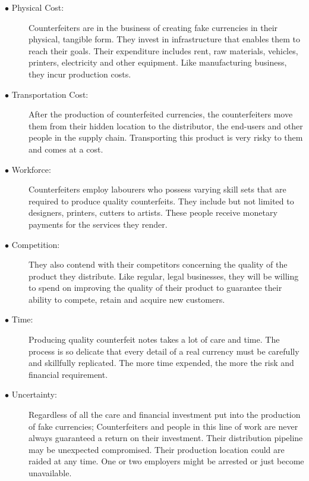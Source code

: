 \vspace{1mm}
\begin{description}
  \item[$\bullet$ Physical Cost:] Counterfeiters are in the business of creating fake currencies in their physical, tangible form. They invest in infrastructure that enables them to reach their goals. Their expenditure includes rent, raw materials, vehicles, printers, electricity and other equipment. Like manufacturing business, they incur production costs.   
  
   \item[$\bullet$ Transportation Cost:] After the production of counterfeited currencies, the counterfeiters move them from their hidden location to the distributor,  the end-users and other people in the supply chain. Transporting this product is very risky to them and comes at a cost. 
   
   \item[$\bullet$ Workforce:] Counterfeiters employ labourers who possess varying skill sets that are required to produce quality counterfeits. They include but not limited to designers, printers, cutters to artists. These people receive monetary payments for the services they render.
   
   \item[$\bullet$ Competition:] They also contend with their competitors concerning the quality of the product they distribute. Like regular, legal businesses, they will be willing to spend on improving the quality of their product to guarantee their ability to compete, retain and acquire new customers. 
   
   \item[$\bullet$ Time:] Producing quality counterfeit notes takes a lot of care and time. The process is so delicate that every detail of a real currency must be carefully and skillfully replicated. The more time expended, the more the risk and financial requirement. 
   
   \item[$\bullet$ Uncertainty:] Regardless of all the care and financial investment put into the production of fake currencies; Counterfeiters and people in this line of work are never always guaranteed a return on their investment. Their distribution pipeline may be unexpected compromised. Their production location could are raided at any time. One or two employers might be arrested or just become unavailable.    
   
 \end{description}

